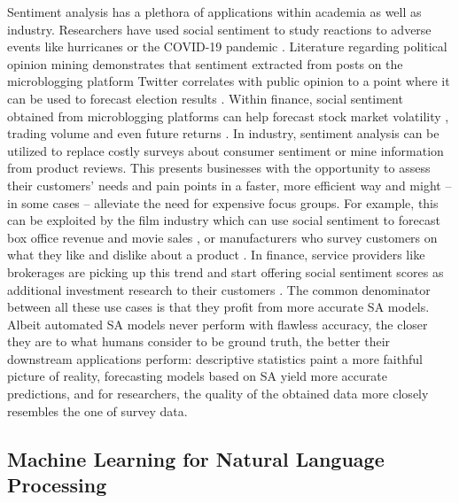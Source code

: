 Sentiment analysis has a plethora of applications within academia as well as industry. Researchers have used social sentiment to study reactions to adverse events like hurricanes  or the COVID-19 pandemic . Literature regarding political opinion mining demonstrates that sentiment extracted from posts on the microblogging platform Twitter correlates with public opinion to a point where it can be used to forecast election results .
Within finance, social sentiment obtained from microblogging platforms can help forecast stock market volatility , trading volume  and even future returns .
In industry, sentiment analysis can be utilized to replace costly surveys about consumer sentiment or mine information from product reviews. This presents businesses with the opportunity to assess their customers' needs and pain points in a faster, more efficient way and might -- in some cases -- alleviate the need for expensive focus groups. For example, this can be exploited by the film industry which can use social sentiment to forecast box office revenue and movie sales , or manufacturers who survey customers on what they like and dislike about a product .
In finance, service providers like brokerages are picking up this trend and start offering social sentiment scores as additional investment research to their customers \cite{ibkr-sentiment}. The common denominator between all these use cases is that they profit from more accurate SA models. Albeit automated SA models never perform with flawless accuracy, the closer they are to what humans consider to be ground truth, the better their downstream applications perform: descriptive statistics paint a more faithful picture of reality, forecasting models based on SA yield more accurate predictions, and for researchers, the quality of the obtained data more closely resembles the one of survey data.

\subsection{Machine Learning for Natural Language Processing}
